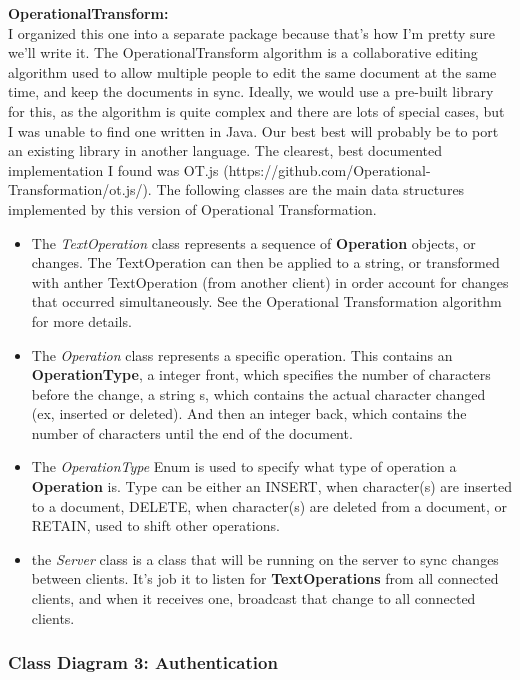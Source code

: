\documentclass[twoside,letterpaper]{article}
\begin{document}
{\begin{itemize}
\end{itemize}
\textbf{OperationalTransform:} \\\bigskip
I organized this one into a separate package because that's how I'm pretty sure we'll write it. The OperationalTransform algorithm is a collaborative editing algorithm used to allow multiple people to edit the same document at the same time, and keep the documents in sync. Ideally, we would use a pre-built library for this, as the algorithm is quite complex and there are lots of special cases, but I was unable to find one written in Java. Our best best will probably be to port an existing library in another language. The clearest, best documented implementation I found was OT.js (https://github.com/Operational-Transformation/ot.js/). The following classes are the main data structures implemented by this version of Operational Transformation.
\begin{itemize}
\item The \textit{TextOperation} class represents a sequence of \textbf{Operation} objects, or changes. The TextOperation can then be applied to a string, or transformed with anther TextOperation (from another client) in order account for changes that occurred simultaneously. See the Operational Transformation algorithm for more details.
\item The \textit{Operation} class represents a specific operation. This contains an \textbf{OperationType}, a integer front, which specifies the number of characters before the change, a string s, which contains the actual character changed (ex, inserted or deleted). And then an integer back, which contains the number of characters until the end of the document.
\item The \textit{OperationType} Enum is used to specify what type of operation a \textbf{Operation} is. Type can be either an INSERT, when character(s) are inserted to a document, DELETE, when character(s) are deleted from a document, or RETAIN, used to shift other operations.
\item the \textit{Server} class is a class that will be running on the server to sync changes between clients. It's job it to listen for \textbf{TextOperations} from all connected clients, and when it receives one, broadcast that change to all connected clients.
\end{itemize}
\newpage
\subsubsection[Class Diagram 3: Authentication]{\rmfamily\bfseries\color{black}
	Class Diagram 3: Authentication}
\hypertarget{RefHeading22059017292}{}
\bigskip

}
\end{document}
